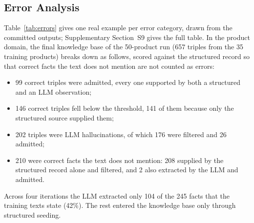 \documentclass[11pt]{article}
\begin{document}
\subsection{Error Analysis}
\label{sec:results-errors}

Table~\ref{tab:errors} gives one real example per error category, drawn
from the committed outputs; Supplementary Section~S9 gives the full
table. In the product domain, the final knowledge base of the 50-product
run (657 triples from the 35 training products) breaks down as follows,
scored against the structured record so that correct facts the text does
not mention are not counted as errors:
\begin{itemize}
\item 99 correct triples were admitted, every one supported by both a
structured and an LLM observation;
\item 146 correct triples fell below the threshold, 141 of them because
only the structured source supplied them;
\item 202 triples were LLM hallucinations, of which 176 were filtered and
26 admitted;
\item 210 were correct facts the text does not mention: 208 supplied by
the structured record alone and filtered, and 2 also extracted by the
LLM and admitted.
\end{itemize}
Across four iterations the LLM extracted only 104 of the 245 facts that
the training texts state (42\%). The rest entered the knowledge base
only through structured seeding.
\end{document}
